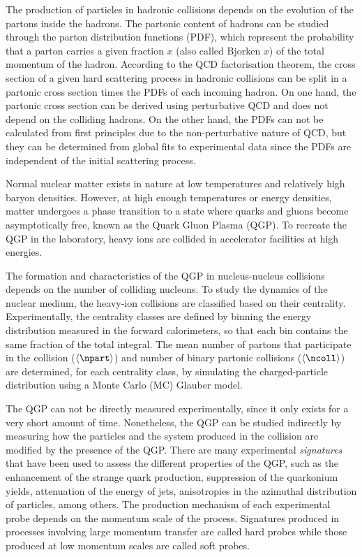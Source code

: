 The production of particles in hadronic collisions depends on the evolution of the partons inside the hadrons. The partonic content of hadrons can be studied through the parton distribution functions (PDF), which represent the probability that a parton carries a given fraction $x$ (also called Bjorken $x$) of the total momentum of the hadron. According to the QCD factorisation theorem, the cross section of a given hard scattering process in hadronic collisions can be split in a partonic cross section times the PDFs of each incoming hadron. On one hand, the partonic cross section can be derived using perturbative QCD and does not depend on the colliding hadrons. On the other hand, the  PDFs can not be calculated from first principles due to the non-perturbative nature of QCD, but they can be determined from global fits to experimental data since the PDFs are independent of the initial scattering process.

Normal nuclear matter exists in nature at low temperatures and relatively high baryon densities. However, at high enough temperatures or energy densities, matter undergoes a phase transition to a state where quarks and gluons become asymptotically free, known as the Quark Gluon Plasma (QGP). To recreate the QGP in the laboratory, heavy ions are collided in accelerator facilities at high energies. 

The formation and characteristics of the QGP in nucleus-nucleus collisions depends on the number of colliding nucleons. To study the dynamics of the nuclear medium, the heavy-ion collisions are classified based on their centrality. Experimentally, the centrality classes are defined by binning the energy distribution measured in the forward calorimeters, so that each bin contains the same fraction of the total integral. The mean number of partons that participate in the collision ($\left\langle\npart\right\rangle$) and number of binary partonic collisions ($\left\langle\ncoll\right\rangle$) are determined, for each centrality class, by simulating the charged-particle distribution using a Monte Carlo (MC) Glauber model.

The QGP can not be directly measured experimentally, since it only exists for a very short amount of time. Nonetheless, the QGP can be studied indirectly by measuring how the particles and the system produced in the collision are modified by the presence of the QGP. There are many experimental \textit{signatures} that have been used to assess the different properties of the QGP, such as the enhancement of the strange quark production, suppression of the quarkonium yields, attenuation of the energy of jets, anisotropies in the azimuthal distribution of particles, among others. The production mechanism of each experimental probe depends on the momentum scale of the process. Signatures produced in processes involving large momentum transfer are called hard probes while those produced at low momentum scales are called soft probes.


